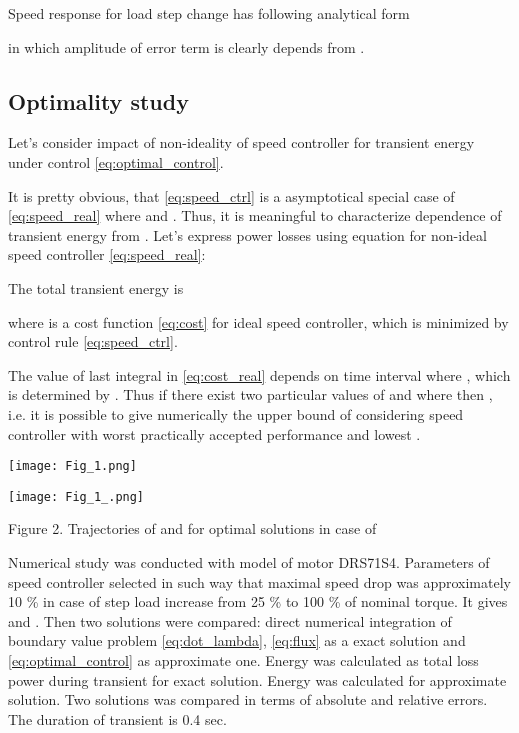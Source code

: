 \documentclass[journal]{IEEEtran}
\begin{document}
Speed response for load step change has following analytical form



in which amplitude of error term  is clearly depends from .

\subsection{Optimality study}

Let's consider impact of non-ideality of speed controller for transient energy under control \eqref{eq:optimal_control}. 

It is pretty obvious, that \eqref{eq:speed_ctrl} is a asymptotical special case of \eqref{eq:speed_real} where  and . Thus, it is meaningful to characterize dependence of transient energy from . Let's express power losses  using equation for non-ideal speed controller \eqref{eq:speed_real}:



The total transient energy is 


where  is a cost function \eqref{eq:cost} for ideal speed controller, which is minimized by control rule \eqref{eq:speed_ctrl}.

The value of last integral in \eqref{eq:cost_real} depends on time interval where , which is determined by . Thus if there exist two particular values of  and  where  then , i.e. it is possible to give numerically the upper bound of  considering speed controller with worst practically accepted performance and lowest .

\begin{center}
\ifpdf \texttt{[image: Fig\_1.png]}
\fi

\ifpdf \texttt{[image: Fig\_1\_.png]}
\fi

Figure 2. Trajectories of  and  for optimal solutions in case of 
\end{center}

Numerical study was conducted with model of motor DRS71S4. Parameters of speed controller selected in such way that maximal speed drop was approximately 10 \% in case of step load increase from 25 \% to 100 \% of nominal torque. It gives  and . Then two solutions were compared: direct numerical integration of boundary value problem \eqref{eq:dot_lambda}, \eqref{eq:flux} as a exact solution and \eqref{eq:optimal_control} as approximate one. Energy  was calculated as total loss power during transient for exact solution. Energy  was calculated for approximate solution. Two solutions was compared in terms of absolute  and relative  errors. The duration of transient is 0.4 sec. 
\end{document}
